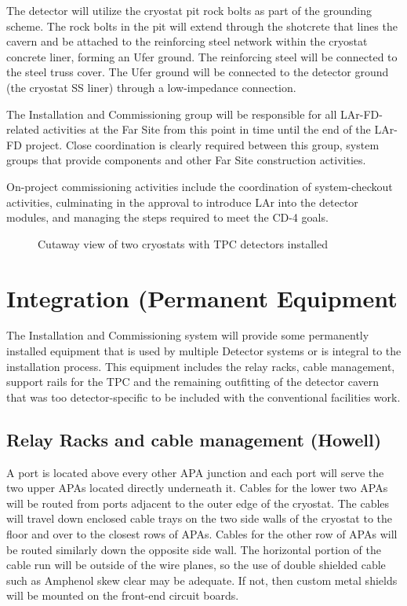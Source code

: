 The detector will utilize the cryostat pit rock bolts as part of the grounding scheme. The rock bolts in the pit will extend through the shotcrete that lines the cavern and be attached to the reinforcing steel network within the cryostat concrete liner, forming an Ufer ground. The reinforcing steel will be connected to the steel truss cover. The Ufer ground will be connected to the detector ground (the cryostat SS liner) through a low-impedance connection.

The Installation and Commissioning group will be responsible for all LAr-FD-related activities at the Far Site from this point in time until the end of the LAr-FD project. Close coordination is clearly required between this group, system groups that provide components and other Far Site construction activities. 

On-project commissioning activities include the coordination of system-checkout activities, culminating in the approval to introduce LAr into the detector modules, and managing the steps required to meet the CD-4 goals. 

\begin{figure}[htpb]
\centering
\caption{Cutaway view of two cryostats with TPC detectors installed}
\label{fig:tpc-in-two-cryostats}
\end{figure}

\section{Integration (Permanent Equipment}
\label{fd:install:integ}

The Installation and Commissioning system will provide some permanently installed equipment that is 
used by multiple Detector systems or is integral to the installation process.  This equipment includes the 
relay racks, cable management, support rails for the TPC and the remaining outfitting of the detector 
cavern that was too detector-specific to be included with the conventional facilities work.

\subsection{Relay Racks and cable management (Howell)}
\label{fd:install:integ:racks}

A port is located above every other APA junction and each port will serve the two upper APAs located directly underneath it. Cables for the lower two APAs will be routed from ports adjacent to the outer edge 
of the cryostat.  The cables will travel down enclosed cable trays on the two side walls of the cryostat to the floor and over to the closest rows of APAs.  Cables for the other row of APAs will be routed similarly 
down the opposite side wall.  The horizontal portion of the cable run will be outside of the wire planes, so the use of double shielded cable such as Amphenol skew clear may be adequate. If not, then custom metal shields will be mounted on the front-end circuit boards. 

